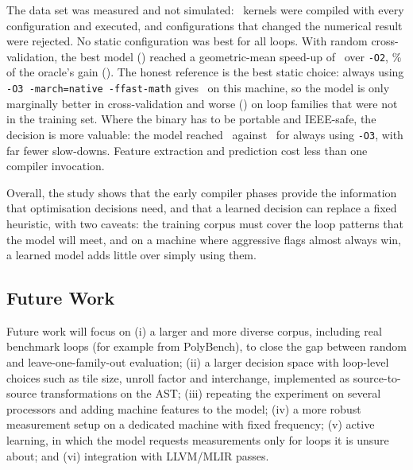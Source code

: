 \documentclass[12pt,a4paper]{article}
\begin{document}
The data set was measured and not simulated: \numKernels\ kernels were compiled with every configuration
and executed, and configurations that changed the numerical result were rejected. No static
configuration was best for all loops. With random cross-validation, the best model (\selModel) reached a
geometric-mean speed-up of \selGMCV\ over \texttt{-O2}, \selFracCV\% of the oracle's gain (\oracleGM). The honest reference is the
best static choice: always using \texttt{-O3 -march=native -ffast-math} gives \gmOFast\ on this machine, so the model
is only marginally better in cross-validation and worse (\selGMLOFO) on loop families that were not in the training set.
Where the binary has to be portable and IEEE-safe, the decision is more valuable: the model reached \pCV\ against \pOThree\ for
always using \texttt{-O3}, with far fewer slow-downs. Feature extraction and prediction cost less than one compiler invocation.

Overall, the study shows that the early compiler phases provide the information that optimisation decisions need,
and that a learned decision can replace a fixed heuristic, with two caveats: the training corpus must cover the
loop patterns that the model will meet, and on a machine where aggressive flags almost always win, a learned model adds
little over simply using them.

\subsection{Future Work}

Future work will focus on (i) a larger and more diverse corpus, including real benchmark loops (for example from
PolyBench), to close the gap between random and leave-one-family-out evaluation; (ii) a larger decision space with
loop-level choices such as tile size, unroll factor and interchange, implemented as source-to-source transformations on the
AST; (iii) repeating the experiment on several processors and adding machine features to the model; (iv) a more
robust measurement setup on a dedicated machine with fixed frequency; (v) active learning, in which the model
requests measurements only for loops it is unsure about; and (vi) integration with LLVM/MLIR passes.

\newpage
\end{document}

